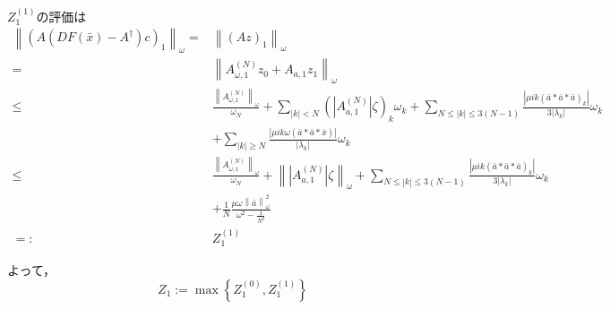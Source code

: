 $Z_1^{(1)}$の評価は
\begin{equation*}
  \begin{split}
    \left\| (A(DF(\bar{x})-A^\dagger)c)_1 \right\|_\omega =& \left\| (Az)_1 \right\|_\omega \\
    =& \left\| A_{\omega,1}^{(N)} z_0 + A_{a,1} z_1 \right\|_\omega \\
    \leq& \frac{\left\| A_{\omega,1}^{(N)} \right\|_\omega}{\omega_N} + \sum_{|k|<N} \left( \left| A_{a,1}^{(N)} \right| \zeta \right)_k \omega_k + \sum_{N \leq |k| \leq 3(N-1)} \frac{\left| \mu ik \left( \bar{a} * \bar{a} * \bar{a} \right)_k \right|}{3\left| \lambda_k \right|} \omega_k \\
    &+ \sum_{|k| \geq N} \frac{\left| \mu ik \omega \left(\bar{a}*\bar{a}*\bar{x}\right) \right|}{\left| \lambda_k \right|} \omega_k \\
    \leq& \frac{\left\| A_{\omega,1}^{(N)} \right\|_\omega}{\omega_N} + \left\| \left| A_{a,1}^{(N)} \right| \zeta \right\|_\omega + \sum_{N\leq|k|\leq 3(N-1)} \frac{\left| \mu ik \left( \bar{a} * \bar{a} * \bar{a} \right)_k \right|}{3\left| \lambda_k \right|} \omega_k \\
    &+ \frac{1}{N} \frac{\mu \omega \left\|\bar{a}\right\|_\omega^2}{\omega^2-\frac{1}{N^2}}\\
    =:& Z_1^{(1)}
  \end{split}
\end{equation*}

よって，
\begin{equation*}
  Z_1 := \max \left\{ Z_1^{(0)}, Z_1^{(1)} \right\}
\end{equation*}

